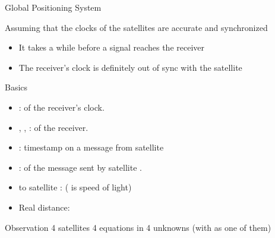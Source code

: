 \begin{slide}{Global Positioning System}
  \begin{block}{Assuming that the clocks of the satellites are accurate and synchronized}
    \begin{itemize}\tightlist
    \item It takes a while before a signal reaches the receiver
    \item The receiver's clock is definitely out of sync with the satellite
    \end{itemize}
  \end{block}
  \begin{block}{Basics}
    \begin{itemize}\tightlist
    \item {}:  of the receiver's clock.
    \item {}, , :  of the receiver.
    \item {}: timestamp on a message from satellite 
    \item {}:  of the message sent by satellite .
    \item {} to satellite :  ( is speed of light)
    \item Real distance: 
    \end{itemize}
  \end{block}
  \begin{block}{Observation}
    4 satellites \mathexpr{\Rightarrow} 4 equations in 4 unknowns (with  as one of them)
  \end{block}
\end{slide}
